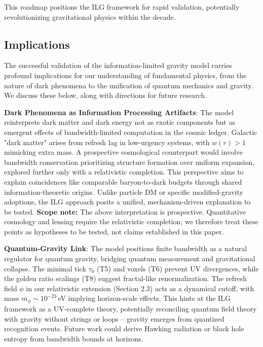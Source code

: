 \documentclass[usenatbib]{mnras}
\begin{document}
This roadmap positions the ILG framework for rapid validation, potentially revolutionizing gravitational physics within the decade.

\subsection{Implications}

The successful validation of the information-limited gravity model carries profound implications for our understanding of fundamental physics, from the nature of dark phenomena to the unification of quantum mechanics and gravity. We discuss these below, along with directions for future research.

\textbf{Dark Phenomena as Information Processing Artifacts}: The model reinterprets dark matter and dark energy not as exotic components but as emergent effects of bandwidth-limited computation in the cosmic ledger. Galactic "dark matter" arises from refresh lag in low-urgency systems, with $w(r) > 1$ mimicking extra mass. A prospective cosmological counterpart would involve bandwidth conservation prioritizing structure formation over uniform expansion, explored further only with a relativistic completion. This perspective aims to explain coincidences like comparable baryon-to-dark budgets through shared information-theoretic origins. Unlike particle DM or specific modified-gravity adoptions, the ILG approach posits a unified, mechanism-driven explanation to be tested.
\textbf{Scope note:} The above interpretation is prospective. Quantitative cosmology and lensing require the relativistic completion; we therefore treat these points as hypotheses to be tested, not claims established in this paper.

\textbf{Quantum-Gravity Link}: The model positions finite bandwidth as a natural regulator for quantum gravity, bridging quantum measurement and gravitational collapse. The minimal tick $\tau_0$ (T5) and voxels (T6) prevent UV divergences, while the golden ratio scalings (T8) suggest fractal-like renormalization. The refresh field $\phi$ in our relativistic extension (Section 2.3) acts as a dynamical cutoff, with mass $m_\phi \sim 10^{-23}$\,eV implying horizon-scale effects. This hints at the ILG framework as a UV-complete theory, potentially reconciling quantum field theory with gravity without strings or loops -- gravity emerges from quantized recognition events. Future work could derive Hawking radiation or black hole entropy from bandwidth bounds at horizons.
\end{document}
